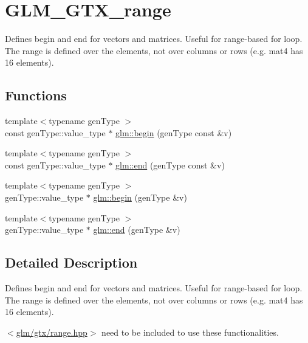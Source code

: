 \hypertarget{group__gtx__range}{}\section{G\+L\+M\+\_\+\+G\+T\+X\+\_\+range}
\label{group__gtx__range}


Defines begin and end for vectors and matrices. Useful for range-\/based for loop. The range is defined over the elements, not over columns or rows (e.\+g. mat4 has 16 elements).  


\subsection*{Functions}
\begin{DoxyCompactItemize}
\item 
{\footnotesize template$<$typename gen\+Type $>$ }\\const gen\+Type\+::value\+\_\+type $\ast$ \hyperlink{group__gtx__range_ga774c16a37371658a2a1540faf9122839}{glm\+::begin} (gen\+Type const \&v)
\item 
{\footnotesize template$<$typename gen\+Type $>$ }\\const gen\+Type\+::value\+\_\+type $\ast$ \hyperlink{group__gtx__range_ga97ffec4ea7e07302f11befff9cb37acd}{glm\+::end} (gen\+Type const \&v)
\item 
{\footnotesize template$<$typename gen\+Type $>$ }\\gen\+Type\+::value\+\_\+type $\ast$ \hyperlink{group__gtx__range_gacc3851df89b9238430e39525c3518ced}{glm\+::begin} (gen\+Type \&v)
\item 
{\footnotesize template$<$typename gen\+Type $>$ }\\gen\+Type\+::value\+\_\+type $\ast$ \hyperlink{group__gtx__range_ga0c303e8c522b139252646a93d5e490d4}{glm\+::end} (gen\+Type \&v)
\end{DoxyCompactItemize}


\subsection{Detailed Description}
Defines begin and end for vectors and matrices. Useful for range-\/based for loop. The range is defined over the elements, not over columns or rows (e.\+g. mat4 has 16 elements). 

$<$\hyperlink{range_8hpp}{glm/gtx/range.\+hpp}$>$ need to be included to use these functionalities. 

